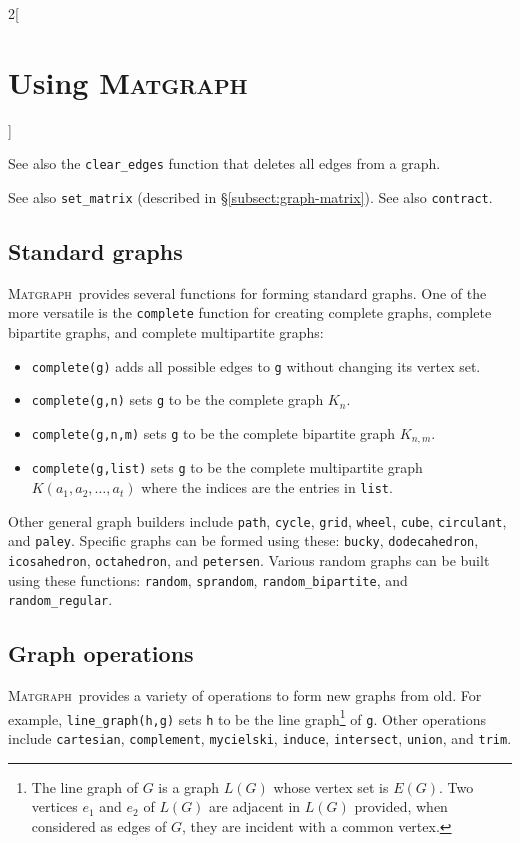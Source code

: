 \documentclass{amsart}
\newcommand\matgraph{\textsc{Matgraph}}
\begin{document}
\begin{multicols}{2}[\section{Using \matgraph}]
\begin{itemize}
  See also the \verb|clear_edges| function that deletes all edges from
  a graph.

\end{itemize}


See also \verb|set_matrix| (described in
\S\ref{subsect:graph-matrix}). See also \verb|contract|. 


\subsection{Standard graphs}

\matgraph\ provides several functions for forming standard
graphs. One of the more versatile is the \verb|complete| function for
creating complete graphs, complete bipartite graphs, and complete
multipartite graphs:
\begin{itemize}
\item \verb|complete(g)| adds all possible edges to \verb|g| without
  changing its vertex set.

\item \verb|complete(g,n)| sets \verb|g| to be the complete graph
  $K_n$. 

\item \verb|complete(g,n,m)| sets \verb|g| to be the complete
  bipartite graph $K_{n,m}$.

\item \verb|complete(g,list)| sets \verb|g| to be the complete
  multipartite graph $K(a_1,a_2,\ldots,a_t)$ where the indices are the
  entries in \verb|list|. 
\end{itemize}

Other general graph builders include \verb|path|, \verb|cycle|,
\verb|grid|, \verb|wheel|, \verb|cube|, \verb|circulant|, and
\verb|paley|. 
Specific graphs can be formed using these: \verb|bucky|,
\verb|dodecahedron|, \verb|icosahedron|, \verb|octahedron|, and
\verb|petersen|.
Various random graphs can be built using these functions:
\verb|random|,
\verb|sprandom|,
\verb|random_bipartite|, and \verb|random_regular|.


\subsection{Graph operations}

\matgraph\ provides a variety of operations to form new graphs from
old. For example, \verb|line_graph(h,g)| sets \verb|h| to be the line
graph\footnote{The line graph of $G$ is a graph $L(G)$ whose vertex
  set is $E(G)$. Two vertices $e_1$ and $e_2$ of $L(G)$ are adjacent
  in $L(G)$ provided, when considered as edges of $G$, they are
  incident with a common vertex.}  of \verb|g|.  Other operations
include \verb|cartesian|, \verb|complement|, \verb|mycielski|,
\verb|induce|, \verb|intersect|, \verb|union|, and \verb|trim|.


\end{multicols}
\end{document}
